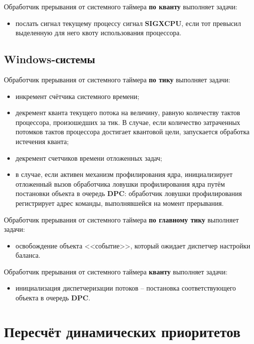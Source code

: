 Обработчик прерывания от системного таймера \textbf{по кванту} выполняет задачи:

\begin{itemize}
    \item послать сигнал текущему процессу сигнал \textbf{SIGXCPU}, если тот превысил выделенную для него квоту использования процессора.
\end{itemize}


\section{Windows-системы}

Обработчик прерывания от системного таймера \textbf{по тику} выполняет задачи:

\begin{itemize}
    \item инкремент счётчика системного времени;
    \item декремент кванта текущего потока на величину, равную количеству тактов процессора, произошедших за тик. В случае, если количество затраченных потомков тактов процессора достигает квантовой цели, запускается обработка истечения кванта;
    \item декремент счетчиков времени отложенных задач;
    \item в случае, если активен механизм профилирования ядра, инициализирует отложенный вызов обработчика ловушки профилирования ядра путём постановки объекта в очередь \textbf{DPC}: обработчик ловушки профилирования регистрирует адрес команды, выполнявшейся на момент прерывания.
\end{itemize}

Обработчик прерывания от системного таймера \textbf{по главному тику} выполняет задачи:

\begin{itemize}
    \item освобождение объекта <<событие>>, который ожидает диспетчер настройки баланса.
\end{itemize}

Обработчик прерывания от системного таймера \textbf{кванту} выполняет задачи:

\begin{itemize}
    \item инициализация диспетчеризации потоков -- постановка соответствующего объекта в очередь \textbf{DPC}.
\end{itemize}

\chapter{Пересчёт динамических приоритетов}

